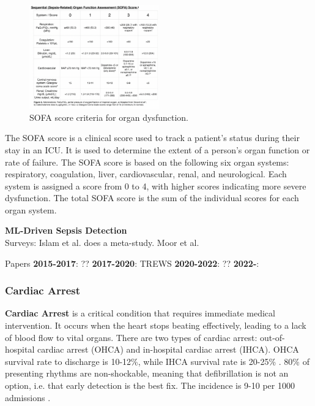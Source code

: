 \begin{figure}[h]
    \centering
    \includegraphics[width=0.5\textwidth]{images/sofa.png}
    \caption{SOFA score criteria for organ dysfunction.}
    \label{fig:sofa}
\end{figure}

The SOFA score is a clinical score used to track a patient's status during their stay in an ICU. It is used to determine the extent of a person's organ function or rate of failure. The SOFA score is based on the following six organ systems: respiratory, coagulation, liver, cardiovascular, renal, and neurological. Each system is assigned a score from 0 to 4, with higher scores indicating more severe dysfunction. The total SOFA score is the sum of the individual scores for each organ system.

\textbf{ML-Driven Sepsis Detection} \\ 
Surveys: Islam et al. \cite{islam2023sepsis} does a meta-study. Moor et al. 


Papers
\textbf{2015-2017}: ?? 
\textbf{2017-2020}: TREWS \cite{adams2022trews} 
\textbf{2020-2022}: ??
\textbf{2022-}: \cite{optimizing_ai_sepsis_2024}


\subsubsection{Cardiac Arrest}
\label{sec:cardiac_arrest}
\textbf{Cardiac Arrest} is a critical condition that requires immediate medical intervention. It occurs when the heart stops beating effectively, leading to a lack of blood flow to vital organs.  There are two types of cardiac arrest: out-of-hospital cardiac arrest (OHCA) and in-hospital cardiac arrest (IHCA). OHCA survival rate to discharge is 10-12\%, while IHCA survival rate is 20-25\% \cite{andersen2019cardiac}. 80\% of presenting rhythms are non-shockable, meaning that defibrillation is not an option, i.e. that early detection is the best fix. The incidence is 9-10 per 1000 admissions \cite{andersen2019cardiac}.

